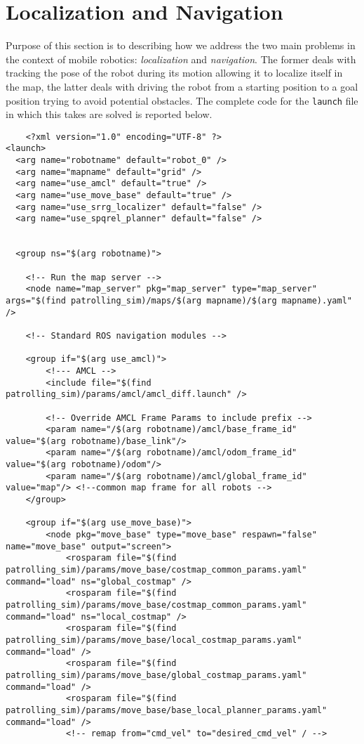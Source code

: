 \section{Localization and Navigation}
Purpose of this section is to describing how we address the two main problems in
the context of mobile robotics: \textit{localization} and \textit{navigation}.
The former deals with tracking the pose of the robot during its motion allowing
it to localize itself in the map, the latter deals with driving the robot from a 
starting position to a goal position trying to avoid potential obstacles.
The complete code for the \texttt{launch} file in which this takes are solved is reported
below.
\begin{lstlisting}
    <?xml version="1.0" encoding="UTF-8" ?>
<launch>
  <arg name="robotname" default="robot_0" />
  <arg name="mapname" default="grid" />
  <arg name="use_amcl" default="true" />
  <arg name="use_move_base" default="true" />
  <arg name="use_srrg_localizer" default="false" />
  <arg name="use_spqrel_planner" default="false" />


  <group ns="$(arg robotname)">    
    
    <!-- Run the map server -->
    <node name="map_server" pkg="map_server" type="map_server" args="$(find patrolling_sim)/maps/$(arg mapname)/$(arg mapname).yaml" />

    <!-- Standard ROS navigation modules -->
    
    <group if="$(arg use_amcl)">
        <!--- AMCL -->
        <include file="$(find patrolling_sim)/params/amcl/amcl_diff.launch" />       
            
        <!-- Override AMCL Frame Params to include prefix -->
        <param name="/$(arg robotname)/amcl/base_frame_id" value="$(arg robotname)/base_link"/>
        <param name="/$(arg robotname)/amcl/odom_frame_id" value="$(arg robotname)/odom"/>
        <param name="/$(arg robotname)/amcl/global_frame_id" value="map"/> <!--common map frame for all robots -->
    </group>
        
    <group if="$(arg use_move_base)">
        <node pkg="move_base" type="move_base" respawn="false" name="move_base" output="screen">
            <rosparam file="$(find patrolling_sim)/params/move_base/costmap_common_params.yaml" command="load" ns="global_costmap" />
            <rosparam file="$(find patrolling_sim)/params/move_base/costmap_common_params.yaml" command="load" ns="local_costmap" />
            <rosparam file="$(find patrolling_sim)/params/move_base/local_costmap_params.yaml" command="load" />
            <rosparam file="$(find patrolling_sim)/params/move_base/global_costmap_params.yaml" command="load" />
            <rosparam file="$(find patrolling_sim)/params/move_base/base_local_planner_params.yaml" command="load" />
            <!-- remap from="cmd_vel" to="desired_cmd_vel" / -->
    

\end{lstlisting}
